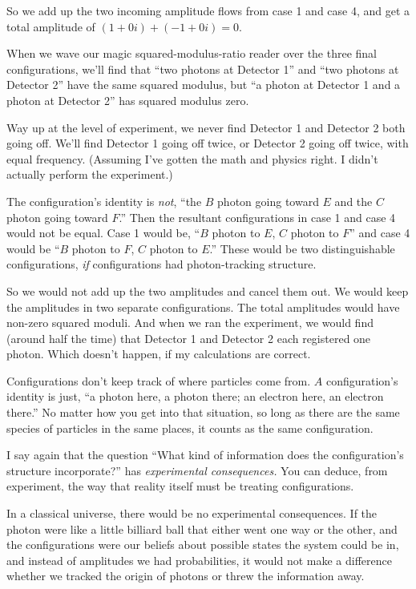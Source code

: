 {
 So we add up the two incoming amplitude flows from case 1 and case
4, and get a total amplitude of $(1 + 0i) + (-1 + 0i) = 0$.}

{
 When we wave our magic squared-modulus-ratio reader over the three
final configurations, we'll find that
``two photons at Detector 1'' and
``two photons at Detector 2'' have
the same squared modulus, but ``a photon at Detector 1
and a photon at Detector 2'' has squared modulus
zero.}

{
 Way up at the level of experiment, we never find Detector 1 and
Detector 2 both going off. We'll find Detector 1 going
off twice, or Detector 2 going off twice, with equal frequency.
(Assuming I've gotten the math and physics right. I
didn't actually perform the experiment.)}

{
 The configuration's identity is \textit{not},
``the $B$ photon going toward $E$ and the $C$ photon going
toward $F$.'' Then the resultant configurations in case
1 and case 4 would not be equal. Case 1 would be, ``$B$
photon to $E$, $C$ photon to $F$'' and case 4 would be
``$B$ photon to $F$, $C$ photon to $E$.''
These would be two distinguishable configurations, \textit{if}
configurations had photon-tracking structure.}

{
 So we would not add up the two amplitudes and cancel them out. We
would keep the amplitudes in two separate configurations. The total
amplitudes would have non-zero squared moduli. And when we ran the
experiment, we would find (around half the time) that Detector 1 and
Detector 2 each registered one photon. Which doesn't
happen, if my calculations are correct.}

{
 Configurations don't keep track of where particles
come from. $A$ configuration's identity is just,
``a photon here, a photon there; an electron here, an
electron there.'' No matter how you get into that
situation, so long as there are the same species of particles in the
same places, it counts as the same configuration.}

{
 I say again that the question ``What kind of
information does the configuration's structure
incorporate?'' has \textit{experimental
consequences.} You can deduce, from experiment, the way that reality
itself must be treating configurations.}

{
 In a classical universe, there would be no experimental
consequences. If the photon were like a little billiard ball that
either went one way or the other, and the configurations were our
beliefs about possible states the system could be in, and instead of
amplitudes we had probabilities, it would not make a difference whether
we tracked the origin of photons or threw the information away.}

